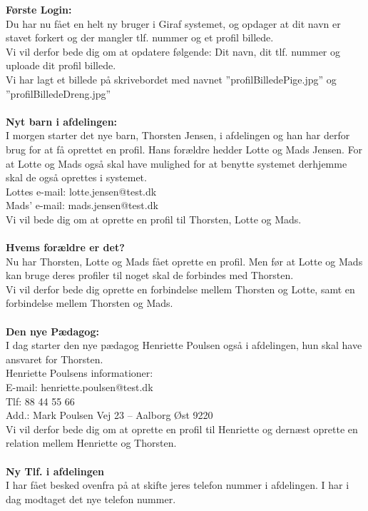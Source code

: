 \textbf{Første Login:}\\
Du har nu fået en helt ny bruger i Giraf systemet, og opdager at dit navn er stavet forkert og der mangler tlf. nummer og et profil billede.\\
Vi vil derfor bede dig om at opdatere følgende: Dit navn, dit tlf. nummer og uploade dit profil billede.\\
Vi har lagt et billede på skrivebordet med navnet ''profilBilledePige.jpg'' og ''profilBilledeDreng.jpg''\\
\\
\textbf{Nyt barn i afdelingen:}\\
I morgen starter det nye barn, Thorsten Jensen, i afdelingen og han har derfor brug for at få oprettet en profil. Hans forældre hedder Lotte og Mads Jensen. For at Lotte og Mads også skal have mulighed for at benytte systemet derhjemme skal de også oprettes i systemet.\\
Lottes e-mail: lotte.jensen@test.dk\\
Mads’ e-mail: mads.jensen@test.dk\\
Vi vil bede dig om at oprette en profil til Thorsten, Lotte og Mads.\\
\\
\textbf{Hvems forældre er det?}\\
Nu har Thorsten, Lotte og Mads fået oprette en profil. Men før at Lotte og Mads kan bruge deres profiler til noget skal de forbindes med Thorsten.\\
Vi vil derfor bede dig oprette en forbindelse mellem Thorsten og Lotte, samt en forbindelse mellem Thorsten og Mads.\\
\\
\textbf{Den nye Pædagog:}\\
I dag starter den nye pædagog Henriette Poulsen også i afdelingen, hun skal have ansvaret for Thorsten.\\
Henriette Poulsens informationer:\\
E-mail: henriette.poulsen@test.dk\\
Tlf: 88 44 55 66\\
Add.: Mark Poulsen Vej 23 – Aalborg Øst 9220\\
Vi vil derfor bede dig om at oprette en profil til Henriette og dernæst oprette en relation mellem Henriette og Thorsten.\\
\\
\textbf{Ny Tlf. i afdelingen}\\
I har fået besked ovenfra på at skifte jeres telefon nummer i afdelingen. I har i dag modtaget det nye telefon nummer.\\
